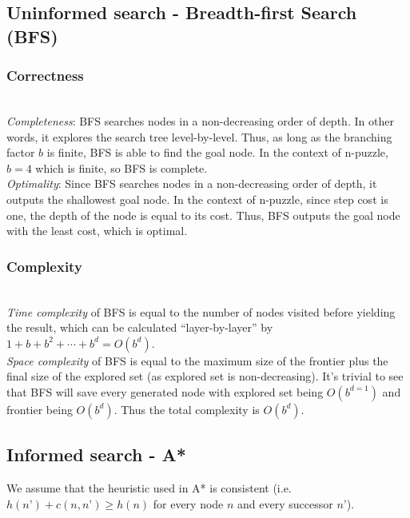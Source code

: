 \documentclass{llncs}
\begin{document}
\subsection{Uninformed search - Breadth-first Search (BFS)}
\subsubsection{Correctness}\hfill\\
\emph{Completeness}: BFS searches nodes in a non-decreasing order of depth. In other words, it explores the search tree level-by-level. Thus, as long as the branching factor $b$ is finite, BFS is able to find the goal node. In the context of n-puzzle, $b=4$ which is finite, so BFS is complete.\\
\emph{Optimality}: Since BFS searches nodes in a non-decreasing order of depth, it outputs the shallowest goal node. In the context of n-puzzle, since step cost is one, the depth of the node is equal to its cost. Thus, BFS outputs the goal node with the least cost, which is optimal.
\subsubsection{Complexity}\hfill\\
\emph{Time complexity} of BFS is equal to the number of nodes visited before yielding the result, which can be calculated “layer-by-layer” by $1+b+b^2+\cdots +b^d = O(b^d)$.\\
\emph{Space complexity} of BFS is equal to the maximum size of the frontier plus the final size of the explored set (as explored set is non-decreasing). It’s trivial to see that BFS will save every generated node with explored set being $O(b^{d=1})$ and frontier being $O(b^d)$. Thus the total complexity is $O(b^d)$.

\subsection{Informed search - A*}
We assume that the heuristic used in A* is consistent (i.e. $h(n’)+c(n,n’) \geq h(n)$ for every node $n$ and every successor $n’$).
\end{document}
